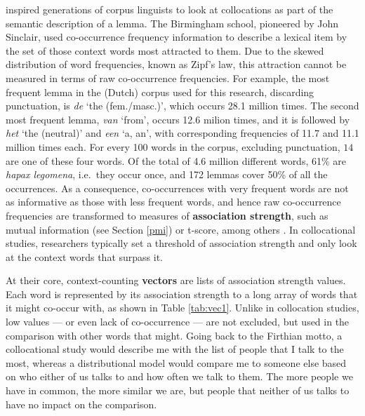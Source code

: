\documentclass[
]{book}
\begin{document}
\textcite{firth_1957a} inspired generations of corpus linguists to look at collocations as part of the semantic description of a lemma. The Birmingham school, pioneered by John Sinclair, used co-occurrence frequency information to describe a lexical item
by the set of those context words most attracted to them. Due to the skewed distribution of word frequencies, known as Zipf's law, this attraction cannot be measured in terms of raw co-occurrence frequencies. For example, the most frequent lemma in the (Dutch) corpus used for this research, discarding punctuation, is \emph{de} `the (fem./masc.)', which occurs 28.1 million times. The second most frequent lemma, \emph{van} `from', occurs 12.6 milion times, and it is followed by \emph{het} `the (neutral)' and \emph{een} `a, an', with corresponding frequencies of 11.7 and 11.1 million times each. For every 100 words in the corpus, excluding punctuation, \(14\) are one of these four words. Of the total of 4.6 million different words, 61\% are \emph{hapax legomena}, i.e.~they occur once, and 172 lemmas cover 50\% of all the occurrences. As a consequence, co-occurrences with very frequent words are not as informative as those with less frequent words, and hence raw co-occurrence frequencies are transformed to measures of \textbf{association strength}, such as mutual information (see Section \ref{pmi}) or t-score, among others \autocites[for an overview see][]{evert_2009,gablasova.etal_2017}.
In collocational studies, researchers typically set a threshold of association strength and only look at the context words that surpass it.

At their core, context-counting \textbf{vectors} are lists of association strength values. Each word is represented by its association strength to a long array of words that it might co-occur with, as shown in Table \ref{tab:vec1}. Unlike in collocation studies, low values --- or even lack of co-occurrence --- are not excluded, but used in the comparison with other words that might. Going back to the Firthian motto, a collocational study would describe me with the list of people that I talk to the most, whereas a distributional model would compare me to someone else based on who either of us talks to and how often we talk to them. The more people we have in common, the more similar we are, but people that neither of us talks to have no impact on the comparison.
\end{document}
